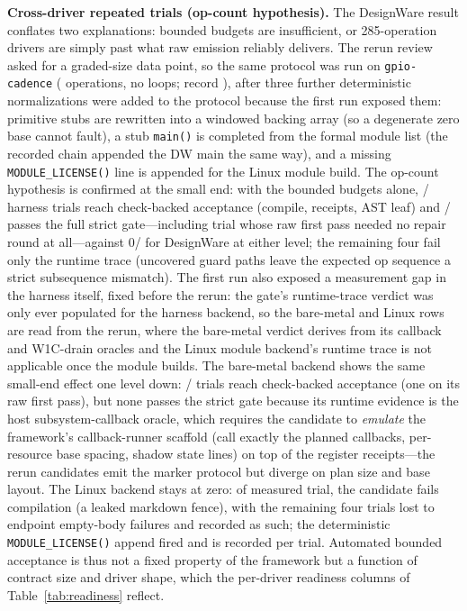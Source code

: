 \textbf{Cross-driver repeated trials (op-count hypothesis).} The
DesignWare result conflates two explanations: bounded budgets are
insufficient, or 285-operation drivers are simply past what raw emission
reliably delivers. The rerun review asked for a graded-size data point, so
the same protocol was run on \texttt{gpio-cadence} (\CadenceRisOps{}
operations, no loops; record
),
after three further deterministic normalizations were added to the
protocol because the first run exposed them: primitive stubs are rewritten
into a windowed backing array (so a degenerate zero base cannot fault),
a stub \texttt{main()} is completed from the formal module list (the
recorded chain appended the DW main the same way), and a missing
\texttt{MODULE\_LICENSE()} line is appended for the Linux module build.
The op-count hypothesis is confirmed at the small end: with the bounded
budgets alone, \CadenceHarnTrialsFinalCheckbacked{}/\CadenceHarnTrialsN{}
harness trials reach check-backed acceptance (compile, receipts, AST
leaf) and \CadenceHarnTrialsFinalStrict{}/\CadenceHarnTrialsN{} passes the
full strict gate---including \CadenceHarnTrialsFirstStrict{} trial whose
raw first pass needed no repair round at all---against 0/\DwHarnTrialsN{}
for DesignWare at either level; the remaining four fail only the runtime
trace (uncovered guard paths leave the expected op sequence a strict
subsequence mismatch). The first run also exposed a measurement gap in
the harness itself, fixed before the rerun: the gate's runtime-trace
verdict was only ever populated for the harness backend, so the
bare-metal and Linux rows are read from the rerun, where the bare-metal
verdict derives from its callback and W1C-drain oracles and the Linux
module backend's runtime trace is not applicable once the module builds.
The bare-metal backend shows the same small-end
effect one level down: \CadenceBareTrialsFinalCheckbacked{}/%
\CadenceBareTrialsN{} trials reach check-backed acceptance (one on its
raw first pass), but none passes the strict gate because its runtime
evidence is the host subsystem-callback oracle, which requires the
candidate to \emph{emulate} the framework's callback-runner scaffold
(call exactly the planned callbacks, per-resource base spacing, shadow
state lines) on top of the register receipts---the rerun candidates
emit the marker protocol but diverge on plan size and base layout.
The Linux backend stays at zero: of \CadenceLinuxTrialsN{} measured
trial, the candidate fails compilation (a leaked markdown fence), with
the remaining four trials lost to endpoint empty-body failures and
recorded as such; the deterministic \texttt{MODULE\_LICENSE()} append
fired and is recorded per trial. Automated bounded acceptance is thus
not a fixed property of the
framework but a function of contract size and driver shape, which the
per-driver readiness columns of Table~\ref{tab:readiness} reflect.

